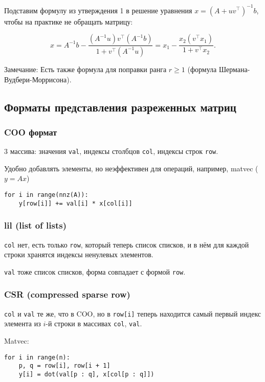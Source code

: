 Подставим формулу из утверждения 1 в решение уравнения
$x = (A + uv^\top)^{-1} b$, чтобы на практике не обращать матрицу:

\[
    x = A^{-1} b - \frac{(A^{-1} u) v^\top (A^{-1} b)}{1 + v^\top (A^{-1} u)}
    = x_1 - \frac{x_2 (v^\top x_1)}{1 + v^\top x_2}.
\]

Замечание: Есть также формула для поправки ранга $r \ge 1$ (формула
Шермана-Вудбери-Моррисона).

\subsection{Форматы представления разреженных матриц}

\subsubsection{COO формат}

3 массива: значения \verb|val|, индексы столбцов \verb|col|, индексы строк
\verb|row|.

Удобно добавлять элементы, но неэффективен для операций, например, matvec
($y = A x$)

\begin{verbatim}
for i in range(nnz(A)):
    y[row[i]] += val[i] * x[col[i]]
\end{verbatim}

\subsubsection{lil (list of lists)}

\verb|col| нет, есть только \verb|row|, который теперь список списков, и в нём
для каждой строки хранятся индексы ненулевых элементов.

\verb|val| тоже список списков, форма совпадает с формой \verb|row|.

\subsubsection{CSR (compressed sparse row)}

\verb|col| и \verb|val| те же, что в COO, но в \verb|row[i]| теперь находится
самый первый индекс элемента из $i$-й строки в массивах \verb|col|, \verb|val|.

Matvec:

\begin{verbatim}
for i in range(n):
    p, q = row[i], row[i + 1]
    y[i] = dot(val[p : q], x[col[p : q]])
\end{verbatim}

